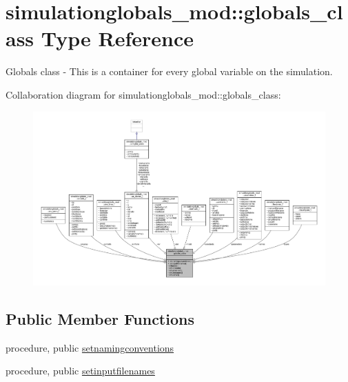\hypertarget{structsimulationglobals__mod_1_1globals__class}{}\section{simulationglobals\+\_\+mod\+:\+:globals\+\_\+class Type Reference}
\label{structsimulationglobals__mod_1_1globals__class}


Globals class -\/ This is a container for every global variable on the simulation.  




Collaboration diagram for simulationglobals\+\_\+mod\+:\+:globals\+\_\+class\+:
\nopagebreak
\begin{figure}[H]
\begin{center}
\leavevmode
\includegraphics[width=350pt]{structsimulationglobals__mod_1_1globals__class__coll__graph}
\end{center}
\end{figure}
\subsection*{Public Member Functions}
\begin{DoxyCompactItemize}
\item 
procedure, public \mbox{\hyperlink{structsimulationglobals__mod_1_1globals__class_a3b33541d0f9a90c78d500b55ef452ee0}{setnamingconventions}}
\item 
procedure, public \mbox{\hyperlink{structsimulationglobals__mod_1_1globals__class_af3060e8a9597abde06dd5362625f5f4e}{setinputfilenames}}
\end{DoxyCompactItemize}
